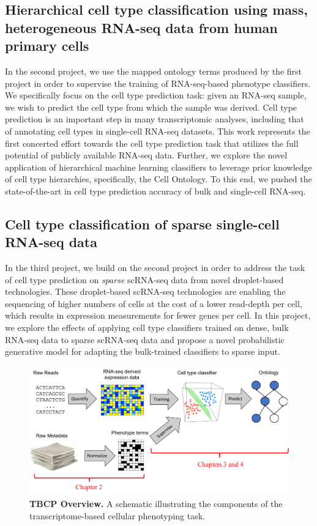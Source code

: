 \subsection{Hierarchical cell type classification using mass, heterogeneous RNA-seq data from human primary cells}

In the second project, we use the mapped ontology terms produced by the first project in order to supervise the training of RNA-seq-based phenotype classifiers. We specifically focus on the cell type prediction task: given an RNA-seq sample, we wish to predict the cell type from which the sample was derived.  Cell type prediction is an important step in many transcriptomic analyses, including that of annotating cell types in single-cell RNA-seq datasets. This work represents the first concerted effort towards the cell type  prediction task that utilizes the full potential of publicly available RNA-seq data.  Further, we explore the novel application of hierarchical machine learning classifiers to leverage prior knowledge of cell type hierarchies, specifically, the Cell Ontology. To this end, we pushed the state-of-the-art in cell type prediction accuracy of bulk and single-cell RNA-seq.  

\subsection{Cell type classification of sparse single-cell RNA-seq data}

In the third project, we build on the second project in order to address the task of cell type prediction on \textit{sparse} scRNA-seq data from novel droplet-based technologies.  These droplet-based scRNA-seq technologies are enabling the sequencing of higher numbers of cells at the cost of a lower read-depth per cell, which results in expression measurements for fewer genes per cell.  In this project, we explore the effects of applying cell type classifiers trained on dense, bulk RNA-seq data to sparse scRNA-seq data and propose a novel probabilistic generative model for adapting the bulk-trained classifiers to sparse input.

\begin{figure}[!tpb]
\centerline{\includegraphics[width=13cm]{figures/phenotyping_dataflow.pdf}}
\caption{\textbf{TBCP Overview.} A schematic illustrating the components of the transcriptome-based cellular phenotyping task.}
\label{fig:phenotyping_dataflow}
\end{figure}




